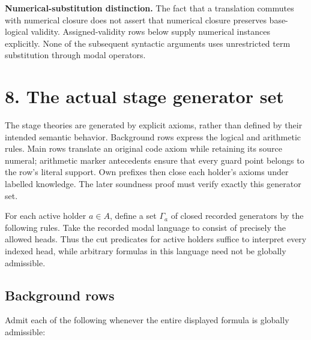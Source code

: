 \documentclass[
  11pt,
  letterpaper,
]{article}
\begin{document}
\textbf{Numerical-substitution distinction.} The fact that a translation
commutes with numerical closure does not assert that numerical closure
preserves base-logical validity. Assigned-validity rows below supply
numerical instances explicitly. None of the subsequent syntactic
arguments uses unrestricted term substitution through modal operators.

\section{8. The actual stage generator
set}\label{the-actual-stage-generator-set}

The stage theories are generated by explicit axioms, rather than defined
by their intended semantic behavior. Background rows express the logical
and arithmetic rules. Main rows translate an original code axiom while
retaining its source numeral; arithmetic marker antecedents ensure that
every guard point belongs to the row's literal support. Own prefixes
then close each holder's axioms under labelled knowledge. The later
soundness proof must verify exactly this generator set.

For each active holder \(a\in A\), define a set \(\Gamma_a\) of closed
recorded generators by the following rules. Take the recorded modal
language to consist of precisely the allowed heads. Thus the cut
predicates for active holders suffice to interpret every indexed head,
while arbitrary formulas in this language need not be globally
admissible.

\subsection{Background rows}\label{background-rows}

Admit each of the following whenever the entire displayed formula is
globally admissible:
\end{document}
